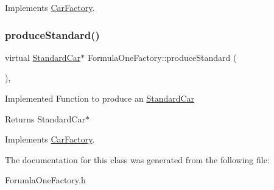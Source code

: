 Implements \mbox{\hyperlink{class_car_factory_a6ea0703f2e692c09dea7a3602836410f}{Car\+Factory}}.

\mbox{\label{class_formula_one_factory_ad58bf42a7a84218f3b022b3b3f6859d4}} 
\subsubsection{\texorpdfstring{produce\+Standard()}{produceStandard()}}
{\footnotesize\ttfamily virtual \mbox{\hyperlink{class_standard_car}{Standard\+Car}}$\ast$ Formula\+One\+Factory\+::produce\+Standard (\begin{DoxyParamCaption}{ }\end{DoxyParamCaption})\hspace{0.3cm}{\ttfamily [inline]}, {\ttfamily [virtual]}}

Implemented Function to produce an \mbox{\hyperlink{class_standard_car}{Standard\+Car}} \begin{DoxyReturn}{Returns}
Standard\+Car$\ast$ 
\end{DoxyReturn}


Implements \mbox{\hyperlink{class_car_factory_a34ffd5237b689fa31a9a593796d296f2}{Car\+Factory}}.



The documentation for this class was generated from the following file\+:\begin{DoxyCompactItemize}
\item 
Forumla\+One\+Factory.\+h\end{DoxyCompactItemize}
